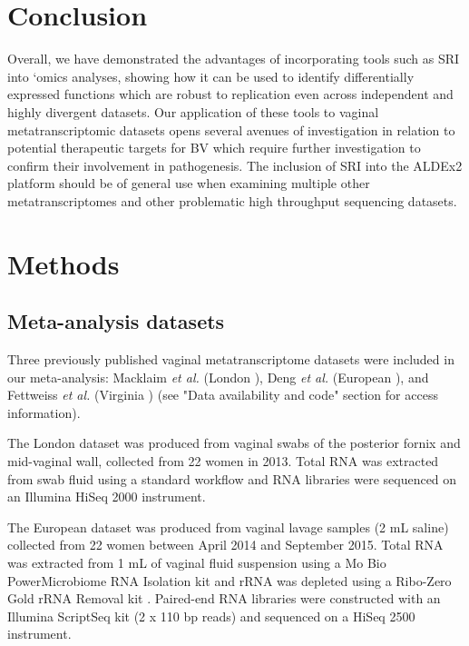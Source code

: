 \documentclass[sn-mathphys,Numbered]{sn-jnl}%
\begin{document}
\section{Conclusion} \label{sec:secConc}

Overall, we have demonstrated the advantages of incorporating tools such as SRI into `omics analyses, showing how it can be used to identify differentially expressed functions which are robust to replication even across independent and highly divergent datasets. Our application of these tools to vaginal metatranscriptomic datasets opens several avenues of investigation in relation to potential therapeutic targets for BV which require further investigation to confirm their involvement in pathogenesis. The inclusion  of SRI into the ALDEx2 platform should be of general use when examining multiple other metatranscriptomes and other problematic high throughput sequencing datasets.

\section{Methods}\label{sec:secMethods}

\subsection{Meta-analysis datasets} \label{subsec:subsecDatasets}
Three previously published vaginal metatranscriptome datasets were included in our meta-analysis: Macklaim \textit{et al.} (London \cite{Macklaim:2018aa}), Deng \textit{et al.} (European \cite{Denge00262-18}), and Fettweiss \textit{et al.} (Virginia \cite{Fettweis:2019aa}) (see "Data availability and code" section for access information). 

The London dataset was produced from vaginal swabs of the posterior fornix and mid-vaginal wall, collected from 22 women in 2013. Total RNA was extracted from swab fluid using a standard workflow \citep{Macklaim:2018aa} and RNA libraries were sequenced on an Illumina HiSeq 2000 instrument. 

The European dataset was produced from vaginal lavage samples (2 mL saline) collected from 22 women between April 2014 and September 2015. Total RNA was extracted from 1 mL of vaginal fluid suspension using a Mo Bio PowerMicrobiome RNA Isolation kit and rRNA was depleted using a Ribo-Zero Gold rRNA Removal kit \citep{Denge00262-18}. Paired-end RNA libraries were constructed with an Illumina ScriptSeq kit (2 x 110 bp reads) and sequenced on a HiSeq 2500 instrument.
\end{document}
